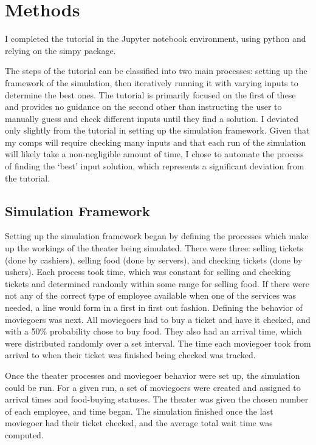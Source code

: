 \documentclass[10pt,twocolumn]{article}
\begin{document}
\section{Methods}

I completed the tutorial in the Jupyter notebook environment, using python and relying on the simpy package.

The steps of the tutorial can be classified into two main processes: setting up the framework of the simulation, then iteratively running it with varying inputs to determine the best ones. The tutorial is primarily focused on the first of these and provides no guidance on the second other than instructing the user to manually guess and check different inputs until they find a solution. I deviated only slightly from the tutorial in setting up the simulation framework. Given that my comps will require checking many inputs and that each run of the simulation will likely take a non-negligible amount of time, I chose to automate the process of finding the ‘best’ input solution, which represents a significant deviation from the tutorial.


\subsection{Simulation Framework}

Setting up the simulation framework began by defining the processes which make up the workings of the theater being simulated. There were three: selling tickets (done by cashiers), selling food (done by servers), and checking tickets (done by ushers). Each process took time, which was constant for selling and checking tickets and determined randomly within some range for selling food. If there were not any of the correct type of employee available when one of the services was needed, a line would form in a first in first out fashion. Defining the behavior of moviegoers was next. All moviegoers had to buy a ticket and have it checked, and with a 50\% probability chose to buy food. They also had an arrival time, which were distributed randomly over a set interval. The time each moviegoer took from arrival to when their ticket was finished being checked was tracked. 

Once the theater processes and moviegoer behavior were set up, the simulation could be run. For a given run, a set of moviegoers were created and assigned to arrival times and food-buying statuses. The theater was given the chosen number of each employee, and time began. The simulation finished once the last moviegoer had their ticket checked, and the average total wait time was computed. 
\end{document}
